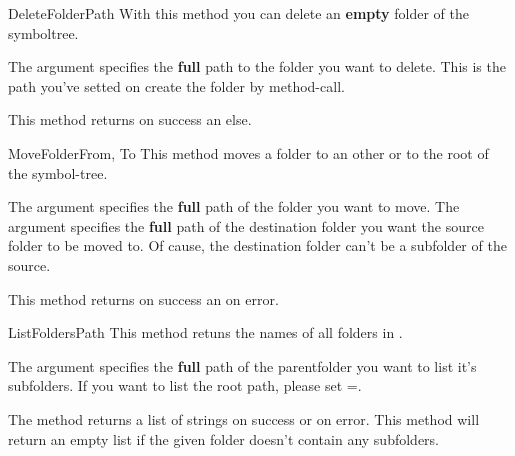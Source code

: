 \begin{methoddesc}[System]{DeleteFolder}{Path}
With this method you can delete an \textbf{empty} folder of the symboltree.

The argument  specifies the \textbf{full} path to the folder you want to
delete. This is the path you've setted on create the folder by 
 method-call.

This method returns  on success an  else.
\end{methoddesc}


\begin{methoddesc}[System]{MoveFolder}{From, To}
This method moves a folder to an other or to the root of the symbol-tree.

The argument  specifies the \textbf{full} path of the folder you want
to move. The argument  specifies the \textbf{full} path of the destination 
folder you want the source folder to be moved to. Of cause, the destination folder
can't be a subfolder of the source.

This method returns  on success an  on error.
\end{methoddesc}


\begin{methoddesc}[System]{ListFolders}{Path}
This method retuns the names of all folders in .

The argument  specifies the \textbf{full} path of the parentfolder
you want to list it's subfolders. If you want to list the root path, please 
set =.

The method returns a list of strings on success or  on error. 
This method will return an empty list if the given folder doesn't contain 
any subfolders.
\end{methoddesc}



